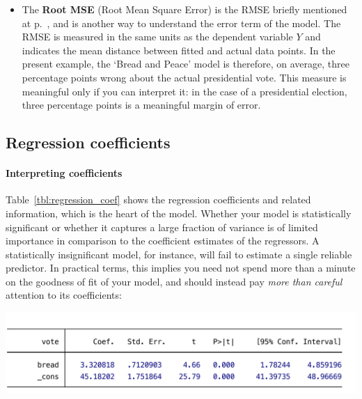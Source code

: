 \begin{itemize}

		\item\label{rmse_explained} The \textbf{Root MSE} (Root Mean Square Error) is the RMSE briefly mentioned at p.~\pageref{rmse}, and is another way to understand the error term of the model. The RMSE is measured in the same units as the dependent variable $Y$ and indicates the mean distance between fitted and actual data points. In the present example, the `Bread and Peace' model is therefore, on average, three percentage points wrong about the actual presidential vote. This measure is meaningful only if you can interpret it: in the case of a presidential election, three percentage points is a meaningful margin of error.

	\end{itemize}

	\subsection{Regression coefficients}%

	\paragraph{Interpreting coefficients}%
  	\label{sec:coefficients}%
	Table~\ref{tbl:regression_coef} shows the regression coefficients and related information, which is the heart of the model. Whether your model is statistically significant or whether it captures a large fraction of variance is of limited importance in comparison to the coefficient estimates of the regressors. A statistically insignificant model, for instance, will fail to estimate a single reliable predictor. In practical terms, this implies you need not spend more than a minute on the goodness of fit of your model, and should instead pay \emph{more than careful} attention to its coefficients:

	\begin{table}[htp]
		\includegraphics[scale=.5]{images/hibbs_yx1_regress_bottom.pdf}

	  	\caption[Extract from  output (2): Regression coefficients]{\label{tbl:regression_coef}%
        Extract from  output (2): %
        Regression coefficients. %
		    \hibbs}
	\end{table}%

